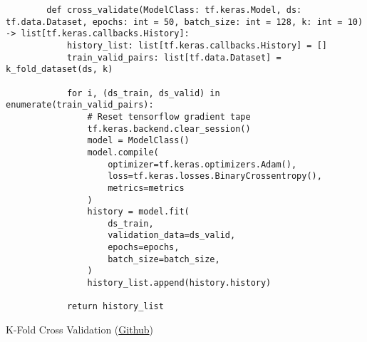 \begin{listing}[H]
        \begin{verbatim}
        def cross_validate(ModelClass: tf.keras.Model, ds: tf.data.Dataset, epochs: int = 50, batch_size: int = 128, k: int = 10) -> list[tf.keras.callbacks.History]:
            history_list: list[tf.keras.callbacks.History] = []
            train_valid_pairs: list[tf.data.Dataset] = k_fold_dataset(ds, k)
        
            for i, (ds_train, ds_valid) in enumerate(train_valid_pairs):
                # Reset tensorflow gradient tape
                tf.keras.backend.clear_session()
                model = ModelClass()
                model.compile(
                    optimizer=tf.keras.optimizers.Adam(),
                    loss=tf.keras.losses.BinaryCrossentropy(),
                    metrics=metrics
                )
                history = model.fit(
                    ds_train,
                    validation_data=ds_valid,
                    epochs=epochs,
                    batch_size=batch_size,
                )
                history_list.append(history.history)

            return history_list
        \end{verbatim}
    \caption{K-Fold Cross Validation (\href{https://github.com/ShenZhouHong/radiography-ai-project/blob/cf8c9e9a1f07849787a98b2fc51df690354bf194/python/common/crossvalidate.py}{Github})}\label{listing:cross-validate}
\end{listing}